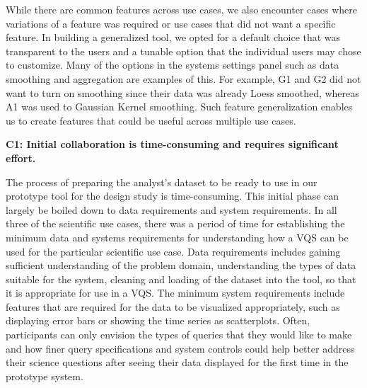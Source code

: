 {
\par While there are common features across use cases, we also encounter cases where variations of a feature was required or use cases that did not want a specific feature. In building a generalized tool, we opted for a default choice that was transparent to the users and a tunable option that the individual users may chose to customize. Many of the options in the systems settings panel such as data smoothing and aggregation are examples of this. For example, G1 and G2 did not want to turn on smoothing since their data was already Loess smoothed, whereas A1 was used to Gaussian Kernel smoothing. Such feature generalization enables us to create features that could be useful across multiple use cases.
\par \textbf{C1: Initial collaboration is time-consuming and requires significant effort.} 
\par The process of preparing the analyst's dataset to be ready to use in our prototype tool for the design study is time-consuming. %
This initial phase can largely be boiled down to data requirements and system requirements. In all three of the scientific use cases, there was a period of time for establishing the minimum data and systems requirements for understanding how a VQS can be used for the particular scientific use case. Data requirements includes gaining sufficient understanding of the problem domain, understanding the types of data suitable for the system, cleaning and loading of the dataset into the tool, so that it is appropriate for use in a VQS. The minimum system requirements include features that are required for the data to be visualized appropriately, such as displaying error bars or showing the time series as scatterplots. Often, participants can only envision the types of queries that they would like to make and how finer query specifications and system controls could help better address their science questions after seeing their data displayed for the first time in the prototype system.
}
